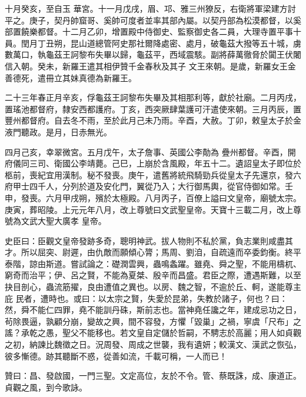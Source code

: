 \begin{pinyinscope}
 十月癸亥，至自玉
 華宮。十一月戊戌，眉、邛、雅三州獠反，右衛將軍梁建方討平之。庚子，契丹帥窟哥、奚帥可度者並率其部內屬。以契丹部為松漠都督，以奚部置饒樂都督。十二月乙卯，增置殿中侍御史、監察御史各二員，大理寺置平事十員。閏月丁丑朔，昆山道總管阿史那社爾降處密、處月，破龜茲大撥等五十城，虜數萬口，執龜茲王訶黎布失畢以歸，龜茲平，西域震駭。副將薛萬徹脅於闐王伏闍信入朝。癸未，新羅王遣其相伊贊千金春秋及其子
 文王來朝。是歲，新羅女王金善德死，遣冊立其妹真德為新羅王。



 二十三年春正月辛亥，俘龜茲王訶黎布失畢及其相那利等，獻於社廟。二月丙戌，置瑤池都督府，隸安西都護府。丁亥，西突厥肆葉護可汗遣使來朝。三月丙辰，置豐州都督府。自去冬不雨，至於此月己未乃雨。辛酉，大赦。丁卯，敕皇太子於金液門聽政。是月，日赤無光。



 四月己亥，幸翠微宮。五月戊午，太子詹事、英國公李勣為
 疊州都督。辛酉，開府儀同三司、衛國公李靖薨。己巳，上崩於含風殿，年五十二。遺詔皇太子即位於柩前，喪紀宜用漢制。秘不發喪。庚午，遣舊將統飛騎勁兵從皇太子先還京，發六府甲士四千人，分列於道及安化門，翼從乃入；大行御馬輿，從官侍御如常。壬申，發喪。六月甲戌朔，殯於太極殿。八月丙子，百僚上謚曰文皇帝，廟號太宗。庚寅，葬昭陵。上元元年八月，改上尊號曰文武聖皇帝。天寶十三載二月，改上尊號為文武大聖大廣孝
 皇帝。



 史臣曰：臣觀文皇帝發跡多奇，聰明神武。拔人物則不私於黨，負志業則咸盡其才。所以屈突、尉遲，由仇敵而願傾心膂；馬周、劉洎，自疏遠而卒委鈞衡。終平泰階，諒由斯道。嘗試論之：礎潤雲興，蟲鳴螽躍。雖堯、舜之聖，不能用檮杌、窮奇而治平；伊、呂之賢，不能為夏桀、殷辛而昌盛。君臣之際，遭遇斯難，以至抉目剖心，蟲流筋擢，良由遭值之異也。以房、魏之智，不逾於丘、軻，遂能尊主庇
 民者，遭時也。或曰：以太宗之賢，失愛於昆弟，失教於諸子，何也？曰：然，舜不能仁四罪，堯不能訓丹硃，斯前志也。當神堯任讒之年，建成忌功之日，茍除畏逼，孰顧分崩，變故之興，間不容發，方懼「毀巢」之禍，寧虞「尺布」之謠？承乾之愚，聖父不能移也。若文皇自定儲於哲嗣，不騁志於高麗；用人如貞觀之初，納諫比魏徵之日。況周發、周成之世襲，我有遺妍；較漢文、漢武之恢弘，彼多慚德。跡其聽斷不惑，從善如流，千載可稱，一人而已！



 贊曰：昌、發啟國，一門三聖。文定高位，友於不令。管、蔡既誅，成、康道正。貞觀之風，到今歌詠。



\end{pinyinscope}